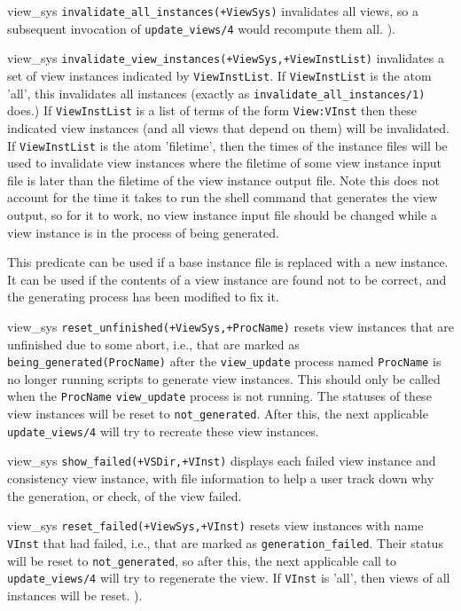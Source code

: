 \begin{description}
{view\_sys}
{\tt invalidate\_all\_instances(+ViewSys)} invalidates all views, so a
subsequent invocation of {\tt update\_views/4} would recompute them
all.  ).

{view\_sys}
{\tt invalidate\_view\_instances(+ViewSys,+ViewInstList)} invalidates a
set of view instances indicated by {\tt ViewInstList}.  If
{\tt ViewInstList} is the atom 'all', this invalidates all instances
(exactly as {\tt invalidate\_all\_instances/1)} does.)  If
{\tt ViewInstList} is a list of terms of the form
{\tt View:VInst} then these indicated view instances (and all
views that depend on them) will be invalidated.  If {\tt ViewInstList}
is the atom 'filetime', then the times of the instance files will be
used to invalidate view instances where the filetime of some view
instance input file is later than the filetime of the view instance
output file.  Note this does not account for the time it takes to run
the shell command that generates the view output, so for it to work,
no view instance input file should be changed while a view instance is
in the process of being generated.

This predicate can be used if a base instance file is replaced with a
new instance.  It can be used if the contents of a view instance are
found not to be correct, and the generating process has been modified
to fix it.

{view\_sys}
{\tt reset\_unfinished(+ViewSys,+ProcName)} resets view instances that
are unfinished due to some abort, i.e., that are marked as
{\tt being\_generated(ProcName)} after the {\tt view\_update} process
named {\tt ProcName} is no longer running scripts to generate view
instances.  This should only be called when the {\tt ProcName}
{\tt view\_update} process is not running.  The statuses of these view
instances will be reset to {\tt not\_generated}.  After this, the next
applicable {\tt update\_views/4} will try to recreate these view
instances.

{view\_sys}
{\tt show\_failed(+VSDir,+VInst)} displays each failed view
instance and consistency view instance, with file information to help
a user track down why the generation, or check, of the view failed.

{view\_sys}
{\tt reset\_failed(+ViewSys,+VInst)} resets view instances with name
{\tt VInst} that had failed, i.e., that are marked as
{\tt generation\_failed}.  Their status will be reset to
{\tt not\_generated}, so after this, the next applicable call to
{\tt update\_views/4} will try to regenerate the view.  If {\tt VInst}
is 'all', then views of all instances will be reset.  ).


\end{description}
